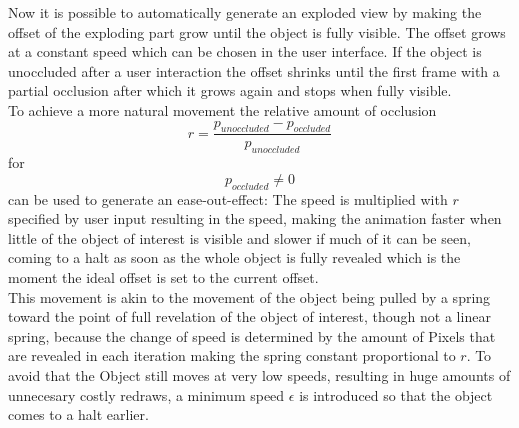 Now it is possible to automatically generate an exploded view by making the offset of the exploding part grow until the object is fully visible. The offset grows at a constant speed which can be chosen in the user interface. If the object is unoccluded after a user interaction the offset shrinks until the first frame with a partial occlusion after which it grows again and stops when fully visible.\\ 
To achieve a more natural movement the relative amount of occlusion
\begin{equation}
	\label{eq:OcclusionRatio}
	r =\frac{p_{unoccluded} - p_{occluded}}{ p_{unoccluded}}
\end{equation}
for
\begin{equation}
	p_{occluded} \neq 0
\end{equation}
can be used to generate an ease-out-effect:
The speed is multiplied with $r$  specified by user input resulting in the speed, making the animation faster when little of the object of interest is visible and slower if much of it can be seen, coming to a halt as soon as the whole object is fully revealed which is the moment the ideal offset is set to the current offset.\\
This movement is akin to the movement of the object being pulled by a spring toward the point of full revelation of the object of interest, though not a linear spring, because the change of speed is determined by the amount of Pixels that are revealed in each iteration making the spring constant proportional to $r$.
To avoid that the Object still moves at very low speeds, resulting in huge amounts of unnecesary costly redraws, a minimum speed $\epsilon$ is introduced so that the object comes to a halt earlier.\\


